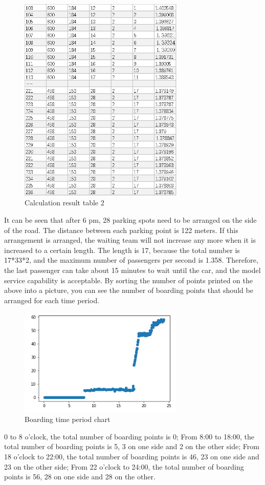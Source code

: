 \begin{enumerate}
\begin{figure}[H]
\centering
\includegraphics[width=0.7\textwidth]{figures/data3_4.png}
\caption{Calculation result table 2}
\label{fig:label}
\end{figure}
It can be seen that after 6 pm, 28 parking spots need to be arranged on the side of the road. The distance between each parking point is 122 meters. If this arrangement is arranged, the waiting team will not increase any more when it is increased to a certain length. The length is 17, because the total number is 17*33*2, and the maximum number of passengers per second is 1.358. Therefore, the last passenger can take about 15 minutes to wait until the car, and the model service capability is acceptable.
By sorting the number of points printed on the above into a picture, you can see the number of boarding points that should be arranged for each time period.
\begin{figure}[H]
\centering
\includegraphics[width=0.7\textwidth]{figures/data3_5.png}
\caption{Boarding time period chart}
\label{fig:label}
\end{figure}
0 to 8 o'clock, the total number of boarding points is 0;
From 8:00 to 18:00, the total number of boarding points is 5, 3 on one side and 2 on the other side;
From 18 o'clock to 22:00, the total number of boarding points is 46, 23 on one side and 23 on the other side;
From 22 o'clock to 24:00, the total number of boarding points is 56, 28 on one side and 28 on the other.


\end{enumerate}
